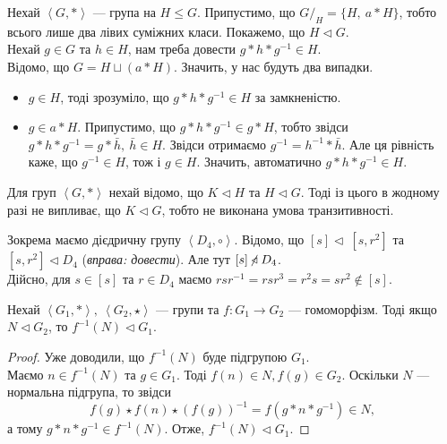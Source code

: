 \documentclass{math_library}
\begin{document}
\begin{example}
Нехай $\left< G, * \right>$ --- група на $H \leq G$. Припустимо, що $G/_H = \{H,\ a*H\}$, тобто всього лише два лівих суміжних класи. Покажемо, що $H \triangleleft G$.
\bigskip \\
Нехай $g \in G$ та $h \in H$, нам треба довести $g*h*g^{-1} \in H$.\\
Відомо, що $G = H \sqcup (a*H)$. Значить, у нас будуть два випадки.
\begin{itemize}[nosep,wide=0pt]
\item $g \in H$, тоді зрозуміло, що $g*h*g^{-1} \in H$ за замкненістю.
\item $g \in a*H$. Припустимо, що $g*h*g^{-1} \in g*H$, тобто звідси $g*h*g^{-1} = g*\bar{h},\ \bar{h} \in H$. Звідси отримаємо $g^{-1} = h^{-1}*\bar{h}$. Але ця рівність каже, що $g^{-1} \in H$, тож і $g \in H$. Значить, автоматично $g*h*g^{-1} \in H$.
\end{itemize}
\end{example}

\begin{remark}
Для груп $\left< G, * \right>$ нехай відомо, що $K \triangleleft H$ та $H \triangleleft G$. Тоді із цього в жодному разі не випливає, що $K \triangleleft G$, тобто не виконана умова транзитивності.
\end{remark}

\begin{example}
Зокрема маємо дієдричну групу $\left< D_4, \circ \right>$. Відомо, що $[s] \triangleleft \ [s,r^2]$ та $[s,r^2] \triangleleft D_4$ (\textit{вправа: довести}). Але тут $[s] \centernot\triangleleft D_4$. \\
Дійсно, для $s \in [s]$ та $r \in D_4$ маємо $rsr^{-1} = rsr^3 = r^2s = sr^2 \notin [s]$.
\end{example}

\begin{proposition}
Нехай $\left<G_1, * \right>,\ \left<G_2, \star \right>$ --- групи та $f \colon G_1 \to G_2$ --- гомоморфізм. Тоді якщо $N \triangleleft G_2$, то $f^{-1}(N) \triangleleft G_1$.
\end{proposition}

\begin{proof}
Уже доводили, що $f^{-1}(N)$ буде підгрупою $G_1$.\\
Маємо $n \in f^{-1}(N)$ та $g \in G_1$. Тоді $f(n) \in N, f(g) \in G_2$. Оскільки $N$ --- нормальна підгрупа, то звідси 
\[
f(g) \star f(n) \star (f(g))^{-1} = f(g*n*g^{-1}) \in N,
\]
а тому $g*n*g^{-1} \in f^{-1}(N)$. Отже, $f^{-1}(N) \triangleleft G_1$. \qedhere
\end{proof}
\end{document}
